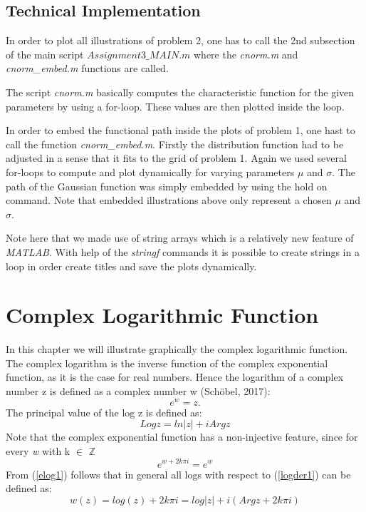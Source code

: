 \documentclass[a4paper,11pt]{article}
\begin{document}
\subsection{Technical Implementation}
In order to plot all illustrations of problem 2, one has to call the 2nd subsection of the main script \textit{$Assignment3\_MAIN.m$} where the \textit{cnorm.m} and \textit{cnorm\_embed.m} functions are called.

The script \textit{cnorm.m} basically computes the characteristic function for the given parameters by using a for-loop. These values are then plotted inside the loop.

In order to embed the functional path inside the plots of problem 1, one hast to call the function \textit{cnorm\_embed.m}. Firstly the distribution function had to be adjusted in a sense that it fits to the grid of problem 1. Again we used several for-loops to compute and plot dynamically for varying parameters $\mu$ and $\sigma$. The path of the Gaussian function was simply embedded by using the hold on command. Note that embedded illustrations above only represent a chosen $\mu$ and $\sigma$.

Note here that we made use of string arrays which is a relatively new feature of \textit{MATLAB}. With help of the \textit{stringf} commands it is possible to create strings in a loop in order create titles and save the plots dynamically. 

\section{Complex Logarithmic Function}
In this chapter we will illustrate graphically the complex logarithmic function. The complex logarithm is the inverse function of the complex exponential function, as it is the case for real numbers. Hence the logarithm of a complex number z is defined as a complex number w (Sch\"obel, 2017):
\begin{equation}
e^w=z.
\label{logder1}
\end{equation}
The principal value of the log z is defined as:
\begin{equation}
Log z = ln|z| + i Arg z
\label{arglog}
\end{equation}
Note that the complex exponential function has a non-injective feature, since for every \textit{w} with k $\in$ $\mathbb{Z}$
\begin{equation}
e^{w+2 k \pi i} = e^w
\label{elog1}
\end{equation}
From (\ref{elog1}) follows that in general all logs with respect to (\ref{logder1}) can be defined as:
\begin{equation*}
w(z)=log(z) +2k \pi i = log|z| + i (Arg z + 2k \pi i)
\end{equation*}
\end{document}
